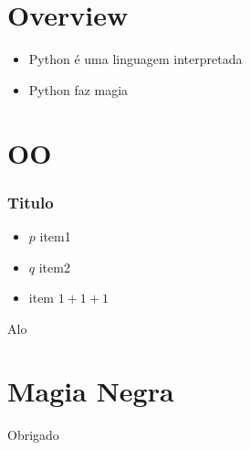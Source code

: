 
\section{Overview}


\begin{frame}[fragile]
    \begin{itemize}
        \item Python é uma linguagem interpretada
        \item Python faz magia
    \end{itemize}
\end{frame}


\section{OO}


\begin{frame}[fragile]
    \frametitle{Titulo}
    \pause
    \begin{itemize}
        \item $p$ item1
            \pause
        \item $q$ item2
            \pause
        \item item $1+1+1$
    \end{itemize}
\end{frame}


\begin{frame}[fragile]
	Alo
\end{frame}

\section{Magia Negra}

\begin{frame}[fragile]
    \begin{center}
        \Huge{Obrigado}
    \end{center}
\end{frame}
